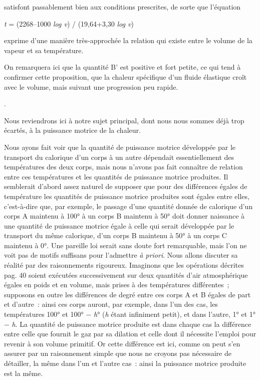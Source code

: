 \documentclass[french,twoside]{book} %
\begin{document}
{ \noindent satisfont passablement bien aux conditions prescrites, de sorte que l’équation\par
 
\begin{center}
\noindent \emph{t} = (2268–1000 \emph{log v}) / (19,64+3,30 \emph{log v})\par
\end{center}

 \noindent exprime d’une manière très-approchée la relation qui existe entre le volume de la vapeur et sa température.\par
 On remarquera ici que la quantité B’ est positive et fort petite, ce qui tend à confirmer cette proposition, que la chaleur spécifique d’un fluide élastique croît avec le volume, mais suivant une progression peu rapide.
}.\par
Nous reviendrons ici à notre sujet principal, dont nous nous sommes déjà trop écartés, à la puissance motrice de la chaleur.\par
Nous ayons fait voir que la quantité de puissance motrice développée par le transport du calorique d’un corps à un autre dépendait essentiellement des températures des deux corps, mais nous n’avons pas fait connaître de relation entre ces températures et les quantités de puissance motrice produites. Il semblerait d’abord assez naturel de supposer que pour des différences égales de température les quantités de puissance motrice produites sont égales entre elles, c’est-à-dire que, par exemple, le passage d’une quantité donnée de calorique d’un corps A maintenu à 100° à un corps B maintenu à 50° doit donner naissance à une quantité de puissance motrice égale à celle qui serait développée par le transport du même calorique, d’un corps B maintenu à 50° à un corps C maintenu à 0°. Une pareille loi serait sans doute fort remarquable, mais l’on ne voit pas de motifs suffisans pour l’admettre \emph{à priori}. Nous allons discuter sa réalité par des raisonnements rigoureux. Imaginons que les opérations décrites pag. 40 soient exécutées successivement sur deux quantités d’air atmosphérique égales en poids et en volume, mais prises à des températures différentes ; supposons en outre les différences de degré entre ces corps A et B égales de part et d’autre : ainsi ces corps auront, par exemple, dans l’un des cas, les températures 100° et 100° − \emph{h}° (\emph{h} étant infiniment petit), et dans l’autre, 1° et 1° − \emph{h}. La quantité de puissance motrice produite est dans chaque cas la différence entre celle que fournit le gaz par sa dilation et celle dont il nécessite l’emploi pour revenir à son volume primitif. Or cette différence est ici, comme on peut s’en assurer par un raisonnement simple que nous ne croyons pas nécessaire de détailler, la même dans l’un et l’autre cas : ainsi la puissance motrice produite est la même.\par
\end{document}
